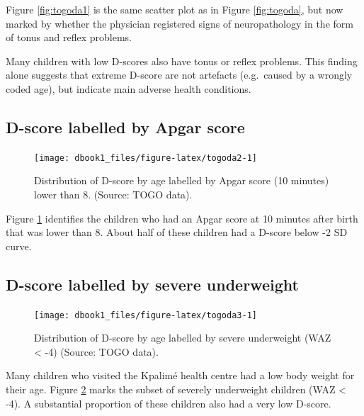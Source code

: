 \documentclass[
]{book}
\begin{document}
Figure \ref{fig:togoda1} is the same scatter plot as in Figure \ref{fig:togoda}, but now marked by whether the physician registered signs of neuropathology in the form of tonus and reflex problems.

Many children with low D-scores also have tonus or reflex problems. This finding alone suggests that extreme D-score are not artefacts (e.g.~caused by a wrongly coded age), but indicate main adverse health conditions.

\hypertarget{d-score-labelled-by-apgar-score}{%
\subsection{D-score labelled by Apgar score}\label{d-score-labelled-by-apgar-score}}

\begin{figure}

{\centering \texttt{[image: dbook1\_files/figure-latex/togoda2-1]} 

}

\caption{Distribution of D-score by age labelled by Apgar score (10 minutes) lower than 8. (Source: TOGO data).}\label{fig:togoda2}
\end{figure}



Figure \ref{fig:togoda2} identifies the children who had an Apgar score at 10 minutes after birth that was lower than 8. About half of these children had a D-score below -2 SD curve.

\hypertarget{d-score-labelled-by-severe-underweight}{%
\subsection{D-score labelled by severe underweight}\label{d-score-labelled-by-severe-underweight}}

\begin{figure}

{\centering \texttt{[image: dbook1\_files/figure-latex/togoda3-1]} 

}

\caption{Distribution of D-score by age labelled by severe underweight (WAZ \textless{} -4) (Source: TOGO data).}\label{fig:togoda3}
\end{figure}



Many children who visited the Kpalimé health centre had a low body weight for their age. Figure \ref{fig:togoda3} marks the subset of severely underweight children (WAZ \textless{} -4). A substantial proportion of these children also had a very low D-score.
\end{document}
